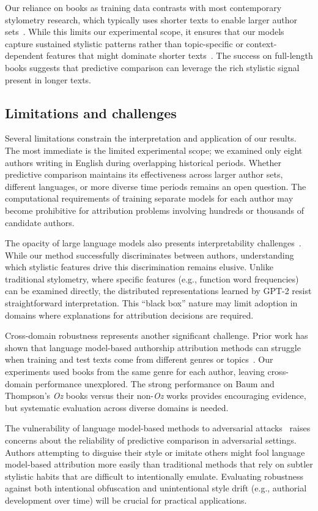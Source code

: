 \documentclass[11pt]{article}
\begin{document}
Our reliance on books as training data contrasts with most contemporary
stylometry research, which typically uses shorter texts to enable larger author
sets~\citep{TyoEtal22}. While this limits our experimental scope, it ensures
that our models capture sustained stylistic patterns rather than
topic-specific or context-dependent features that might dominate shorter
texts~\citep{FincBosc24}. The success on full-length books suggests that
predictive comparison can leverage the rich stylistic signal present in
longer texts.

\subsection{Limitations and challenges}

Several limitations constrain the interpretation and application of our results.
The most immediate is the limited experimental scope; we examined only eight
authors writing in English during overlapping historical periods. Whether
predictive comparison maintains its effectiveness across larger author sets,
different languages, or more diverse time periods remains an open question.
The computational requirements of training separate models for each author may
become prohibitive for attribution problems involving hundreds or thousands of
candidate authors.

The opacity of large language models also presents interpretability
challenges~\citep{SchuEtal20}. While our method successfully discriminates
between authors, understanding which stylistic features drive this
discrimination remains elusive. Unlike traditional stylometry, where specific
features (e.g., function word frequencies) can be examined directly, the
distributed representations learned by GPT-2 resist straightforward
interpretation. This ``black box'' nature may limit adoption in domains where
explanations for attribution decisions are required.

Cross-domain robustness represents another significant challenge. Prior work
has shown that language model-based authorship attribution methods can struggle
when training and test texts come from different genres or
topics~\citep{BarlStam20}. Our experiments used books from the same genre for
each author, leaving cross-domain performance unexplored. The strong
performance on Baum and Thompson's \emph{Oz} books versus their non-\emph{Oz}
works provides encouraging evidence, but systematic evaluation across diverse
domains is needed.

The vulnerability of language model-based methods to adversarial
attacks~\citep{QuirMaie19} raises concerns about the reliability of predictive
comparison in adversarial settings. Authors attempting to disguise their style
or imitate others might fool language model-based attribution more easily than
traditional methods that rely on subtler stylistic habits that are difficult to
intentionally emulate. Evaluating robustness against both intentional
obfuscation and unintentional style drift (e.g., authorial development over
time) will be crucial for practical applications.
\end{document}
